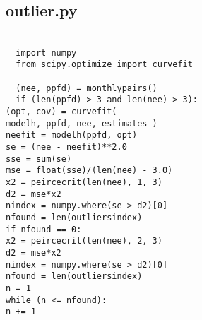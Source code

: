 \subsection{outlier.py}
\label{app:outlierpy}
\texttt{ \\
~~import numpy\\
~~from scipy.optimize import curve\textunderscore fit\\
~~\\
~~(nee, ppfd) = monthly\textunderscore pairs()\\
~~if (len(ppfd) > 3 and len(nee) > 3):\\
 \indent (opt, cov) = curve\textunderscore fit(\\
 \indent \indent model\textunderscore h, ppfd, nee, estimates
 \indent \indent )\\
 \indent nee\textunderscore fit = model\textunderscore h(ppfd,
                     opt)\\
 \indent se = (nee - nee\textunderscore fit)**2.0\\
 \indent sse = sum(se)\\
 \indent mse = float(sse)/(len(nee) - 3.0)\\
 \indent x2 = peirce\textunderscore crit(len(nee), 1, 3)\\
 \indent d2 = mse*x2\\
 \indent n\textunderscore index = numpy.where(se > d2)[0]\\
 \indent n\textunderscore found = 
                     len(outliers\textunderscore index)\\
 \indent if n\textunderscore found == 0:\\
 \indent \indent x2 = peirce\textunderscore crit(len(nee), 2, 3)\\
 \indent \indent d2 = mse*x2\\
 \indent \indent n\textunderscore index = numpy.where(se > d2)[0]\\
 \indent \indent n\textunderscore found = 
                             len(outliers\textunderscore index)\\
 \indent n = 1\\
 \indent while (n <= n\textunderscore found):\\
 \indent \indent n += 1\\
}

